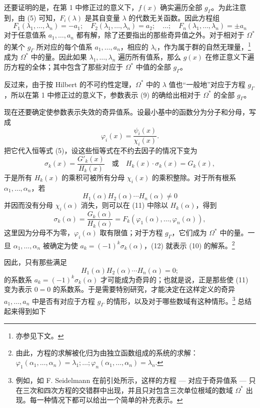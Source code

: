 还要证明的是，在第 1 中修正过的意义下，$f(x)$ 确实遍历全部 $g_\Gamma$。为此注意到，由 (5) 可知，$F_i(\lambda)$ 是其自变量 $\lambda$ 的代数无关函数。因此方程组
\begin{equation}\tag{10}
F_1(\lambda_1,
\ldots,\lambda_n)=-a_1;\quad F_2(\lambda_1,
\ldots,\lambda_n)=a_2;\quad\ldots;\quad F_n(\lambda_1,
\ldots,\lambda_n)=\pm a_n
\end{equation}
对于任意值系 $a_1,
\ldots,a_n$ 都有解，除了还要指出的那些奇异值之外。对于相对于 $\Omega^*$ 的某个 $g_\Gamma$ 所对应的每个值系 $a_1,
\ldots,a_n$，相应的 $\lambda_i$，作为属于群的自然无理量，\footnote{亦参见下文。}成为 $\Omega^*$ 中的量。因此如果 $\lambda_1,
\ldots,\lambda_n$ 遍历所有值系，那么 $g(x)$ 在修正意义下遍历方程的全体；其中包含了那些对应于 $\Omega^*$ 中值的全部 $g_\Gamma$。

反过来，由于按 Hilbert 的不可约性定理，$\Omega^*$ 中的 $\lambda$ 值也“一般地”对应于方程 $g_\Gamma$，所以在第 1 中修正过的意义下，参数表示 (9) 的确给出相对于 $\Omega^*$ 的全部 $g_\Gamma$。

现在还要确定使参数表示失效的奇异值系。设最小基中的函数分为分子和分母，写成
\[
\varphi_i(x)=\frac{\psi_i(x)}{\chi_i(x)}.
\]
把它代入恒等式 (5)，设这些恒等式在不约去因子的情况下变为
\begin{equation}\tag{11}
\sigma_k(x)=\frac{G'_k(x)}{H_k(x)}\quad\text{或}\quad H_k(x)\cdot\sigma_k(x)=G_k(x),
\end{equation}
于是所有 $H_k(x)$ 的乘积可被所有分母 $\chi_i(x)$ 的乘积整除。对于所有根系 $\alpha_1,
\ldots,\alpha_n$，若
\[
H_1(\alpha)H_2(\alpha)\cdots H_n(\alpha)\ne0
\]
并因而没有分母 $\chi_i(\alpha)$ 消失，则可以在 (11) 中除以 $H_k(\alpha)$，得到
\begin{equation}\tag{12}
\sigma_k(\alpha)=\frac{G_k(\alpha)}{H_k(\alpha)}=F_k(\varphi_1(\alpha),\ldots,\varphi_n(\alpha)),
\end{equation}
这里因为分母不为零，$\varphi_i(\alpha)$ 取有限值；对于方程 $g_\Gamma$，它们成为 $\Omega^*$ 中的量。一旦 $\alpha_1,
\ldots,\alpha_n$ 被确定为使 $a_k=(-1)^k\sigma_k(\alpha)$，(12) 就表示 (10) 的解系。\footnote{由此，方程的求解被化归为由独立函数组成的系统的求解：
$\varphi_1(\alpha_1,
\ldots,\alpha_n)=\lambda_1;\ldots;\varphi_n(\alpha_1,
\ldots,\alpha_n)=\lambda_n$.}

因此，只有那些满足
\[
H_1(\alpha)H_2(\alpha)\cdots H_n(\alpha)=0;
\]
的系数系 $a_k=(-1)^k\sigma_k(\alpha)$ 才可能成为奇异的；也就是说，正是那些使 (11) 变为表示 $0=0$ 的系数系。于是需要特别研究，才能决定在这样定义的奇异 $a_1,
\ldots,a_n$ 中是否有对应于方程 $g_\Gamma$ 的情形，以及对于哪些数域有这种情形。\footnote{例如，如 F. Seidelmann 在前引处所示，这样的方程 --- 对应于奇异值系 --- 只在三次和四次方程的交错群中出现，并且只对包含三次单位根域的数域 $\Omega^*$ 出现。每一种情况下都可以给出一个简单的补充表示。} 总结起来得到如下

